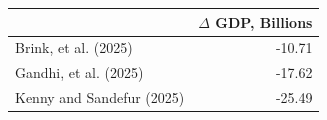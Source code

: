 \begin{tabular}{lr}
\toprule
 & $\Delta$ GDP, Billions \\
\midrule
Brink, et al. (2025) & -10.71 \\
Gandhi, et al. (2025) & -17.62 \\
Kenny and Sandefur (2025) & -25.49 \\
\bottomrule
\end{tabular}
